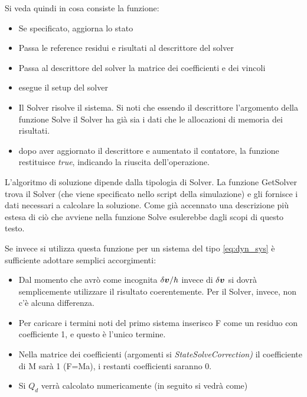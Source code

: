 Si veda quindi in cosa consiste la funzione:
\begin{itemize}
    \item Se specificato, aggiorna lo stato
    \item Passa le reference residui e risultati al descrittore del solver 
    \item Passa al descrittore del solver la matrice dei coefficienti e dei vincoli
    \item esegue il setup del solver
    \item Il Solver risolve il sistema. Si noti che essendo il descrittore l'argomento della funzione Solve il Solver ha già sia i dati che le allocazioni di memoria dei risultati.
    \item dopo aver aggiornato il descrittore e aumentato il contatore, la funzione restituisce \textit{true}, indicando la riuscita dell'operazione.
\end{itemize}
L'algoritmo di soluzione dipende dalla tipologia di Solver. La funzione GetSolver trova il Solver (che viene specificato nello script della simulazione) e gli fornisce i dati necessari a calcolare la soluzione. Come già accennato una descrizione più estesa di ciò che avviene nella funzione Solve esulerebbe dagli scopi di questo testo.

Se invece si utilizza questa funzione per un sistema del tipo \ref{eq:dyn_sys} è sufficiente adottare semplici accorgimenti:
\begin{itemize}
    \item Dal momento che avrò come incognita $\delta{\boldsymbol{v}}/h$ invece di $\delta{\boldsymbol{v}}$ si dovrà semplicemente utilizzare il risultato coerentemente. Per il Solver, invece, non c'è alcuna differenza.
    \item Per caricare i termini noti del primo sistema inserisco F come un residuo con coefficiente 1, e questo è l'unico termine.
    \item Nella matrice dei coefficienti (argomenti si \textit{StateSolveCorrection)} il coefficiente di M sarà 1 (F=Ma), i restanti coefficienti saranno 0.
    \item Si  $Q_d$ verrà calcolato numericamente (in seguito si vedrà come)
\end{itemize}


